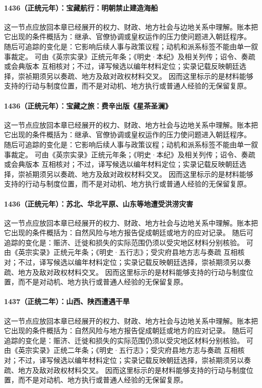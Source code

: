 \paragraph{1436（正统元年）：宝藏航行：明朝禁止建造海船} 这一节点应放回本章已经展开的权力、财政、地方社会与边地关系中理解。账本把它出现的条件概括为：继承、官僚协调或皇权运作的压力使问题进入朝廷程序。 随后可追踪的变化是：它影响后续人事与政策议程；动机和派系标签不能由单一叙事裁定。 可由《英宗实录》正统元年条；《明史·本纪》及相关列传；诏令、奏疏或会典版本 互相核对；不过，译写候选以编年材料定位；实录记载反映朝廷选择，崇祯期须另以奏疏、地方及敌对政权材料交叉。 因而这里标示的是材料能够支持的行动与制度位置，而不是对动机、地方执行或普通人经验的无保留复原。

\paragraph{1436（正统元年）：宝藏之旅：费辛出版《星茶圣澜》} 这一节点应放回本章已经展开的权力、财政、地方社会与边地关系中理解。账本把它出现的条件概括为：继承、官僚协调或皇权运作的压力使问题进入朝廷程序。 随后可追踪的变化是：它影响后续人事与政策议程；动机和派系标签不能由单一叙事裁定。 可由《英宗实录》正统元年条；《明史·本纪》及相关列传；诏令、奏疏或会典版本 互相核对；不过，译写候选以编年材料定位；实录记载反映朝廷选择，崇祯期须另以奏疏、地方及敌对政权材料交叉。 因而这里标示的是材料能够支持的行动与制度位置，而不是对动机、地方执行或普通人经验的无保留复原。

\paragraph{1436（正统元年）：苏北、华北平原、山东等地遭受洪涝灾害} 这一节点应放回本章已经展开的权力、财政、地方社会与边地关系中理解。账本把它出现的条件概括为：自然风险与地方报告促成朝廷或地方的应对记录。 随后可追踪的变化是：赈济、迁徙和损失的实际范围仍须以受灾地区材料分别核验。 可由《英宗实录》正统元年条；《明史·五行志》；受灾府县地方志与奏疏 互相核对；不过，译写候选以编年材料定位；实录记载反映朝廷选择，崇祯期须另以奏疏、地方及敌对政权材料交叉。 因而这里标示的是材料能够支持的行动与制度位置，而不是对动机、地方执行或普通人经验的无保留复原。

\paragraph{1437（正统二年）：山西、陕西遭遇干旱} 这一节点应放回本章已经展开的权力、财政、地方社会与边地关系中理解。账本把它出现的条件概括为：自然风险与地方报告促成朝廷或地方的应对记录。 随后可追踪的变化是：赈济、迁徙和损失的实际范围仍须以受灾地区材料分别核验。 可由《英宗实录》正统二年条；《明史·五行志》；受灾府县地方志与奏疏 互相核对；不过，译写候选以编年材料定位；实录记载反映朝廷选择，崇祯期须另以奏疏、地方及敌对政权材料交叉。 因而这里标示的是材料能够支持的行动与制度位置，而不是对动机、地方执行或普通人经验的无保留复原。


